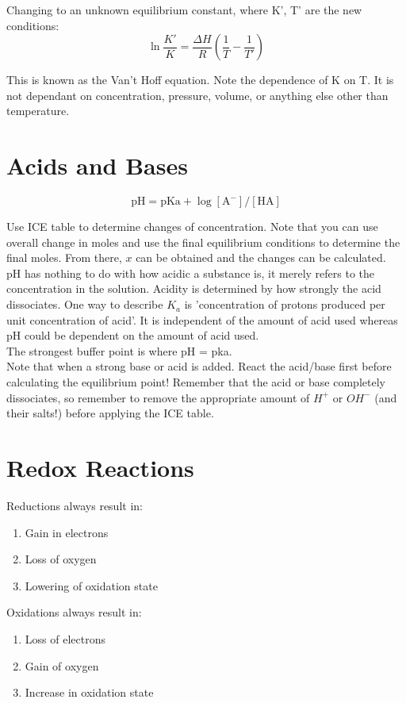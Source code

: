 \documentclass{article}
\begin{document}
Changing to an unknown equilibrium constant, where K', T' are the new conditions:
\[
\ln \frac{K'}{K} = \frac{\Delta H}{R} (\frac{1}{T} - \frac{1}{T'})
\]

This is known as the Van't Hoff equation. Note the dependence of K on T. It is not dependant on concentration, pressure, volume, or anything else other than temperature.

\section{Acids and Bases}

\[
\text{pH} = \text{pKa} + \log[\text{A}^-]/[\text{HA}]
\]

Use ICE table to determine changes of concentration. Note that you can use overall change in moles and use the final equilibrium conditions to determine the final moles. From there, $x$ can be obtained and the changes can be calculated.\\

pH has nothing to do with how acidic a substance is, it merely refers to the concentration in the solution. Acidity is determined by how strongly the acid dissociates. One way to describe $K_a$ is 'concentration of protons produced per unit concentration of acid'. It is independent of the amount of acid used whereas pH could be dependent on the amount of acid used.\\

The strongest buffer point is where pH = pka.\\

Note that when a strong base or acid is added. React the acid/base first before calculating the equilibrium point! Remember that the acid or base completely dissociates, so remember to remove the appropriate amount of $H^+$ or $OH^-$ (and their salts!) before applying the ICE table.\\

\section{Redox Reactions}
Reductions always result in:
\begin{enumerate}
\item Gain in electrons
\item Loss of oxygen
\item Lowering of oxidation state
\end{enumerate}
Oxidations always result in:
\begin{enumerate}
\item Loss of electrons
\item Gain of oxygen
\item Increase in oxidation state

\end{enumerate}
\end{document}
